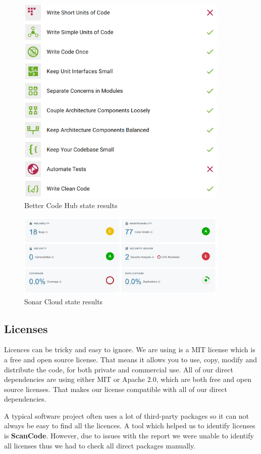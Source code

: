 \documentclass[10pt]{article}
\begin{document}
\begin{figure} [H]
  \centering
  \includegraphics[width=0.9\textwidth]{images/bettercodehub.png}
  \caption{Better Code Hub state results}
  \label{fig:bch}
\end{figure}

\begin{figure} [H]
  \centering
  \includegraphics[width=0.9\textwidth]{images/sonarcloud.png}
  \caption{Sonar Cloud state results}
  \label{fig:sc}
\end{figure}


\subsection{Licenses}
Licences can be tricky and easy to ignore. We are using is a MIT license which is a free and open source license. That means it allows you to use, copy, modify and distribute the code, for both private and commercial use. All of our direct dependencies are using either MIT or Apache 2.0, which are both free and open source licenses. That makes our license compatible with all of our direct dependencies. \par
A typical software project often uses a lot of third-party packages so it can not always be easy to find all the licences. A tool which helped us to identify licenses is  \textbf{ScanCode}. However, due to issues with the report we were unable to identify all licenses thus we had to check all direct packages manually. 
\end{document}
